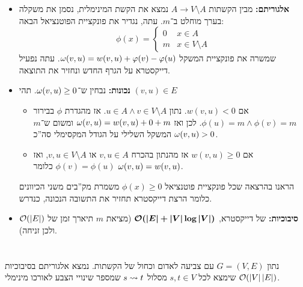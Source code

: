 \documentclass[]{../../../../tex/classes/homework}
\begin{document}
	\begin{itemize}
		\item \textbf{אלגוריתם: }מבין הקשתות $A \to V \setminus A$ נמצא את הקשת המינימלית, נסמן את משקלה בערך מוחלט ב־$m$. עתה, נגדיר את פונקציית הפוטנציאל הבאה: 
		\[ \phi(x) = \begin{cases}
			0 & x \in A \\
			m & x \in V \setminus  A
		\end{cases} \]
		שמשרה את פונקציית המשקל $\omega(v, u) = w(v, u) + \varphi(v) - \varphi(u)$. עתה נפעיל דייקסטרא על הגרף החדש ונחזיר את התוצאה. 
		\item \textbf{נכונות: }נבחין ש־$\omega(v, u) \ge 0$. תהי $(v, u) \in E$
		\begin{itemize}
			\item אם $w(v, u) < 0$. נתון $u \in A \land v \in V \setminus A$. אז מהגדרת $\phi$ בבירור $\phi(u) = m \land \phi(v) = m$. לכן ואז $\omega(v, u) = w(v, u) + 0 + m$ ומשום ש־$m$ המשקל השלילי על הגודל המקסימלי סה''כ $\omega(v, u) > 0$. 
			\item אם $w(v, u) \ge 0$ אז מהנתון בהכרח $v, u \in A$ או $v, u \in V \setminus A$, ואז $\phi(v) = \phi(u)$ כלומר $\omega(v, u) = w(v, u)$. 
		\end{itemize}
		הראנו בהרצאה שכל פונקציית פוטנציאל $\phi(x) \ge 0$ משמרת מק''בים משני הכיוונים כלומר הרצת דייקסטרא תחזיר את התשובה הנכונה, כנדרש. 
		\item \textbf{סיבוכיות: }של דייקסטרא, $\bm{\mathcal{O}(\left \lvert E \right \rvert + \left \lvert V \right \rvert \log \left \lvert V \right \rvert)}$ (מציאת $m$ תיארך זמן של $\mathcal{O}(\left \lvert E \right \rvert)$ ולכן זניחה). 
	\end{itemize}
	
	\npage
	\section{}
	נתון $G = (V, E)$ עם צביעה לאדום וכחול של הקשתות. נמצא אלגוריתם בסיבוכיות $\mathcal{O}(\left \lvert V \right \rvert \left \lvert E \right \rvert)$ שימצא לכל $s, t \in V$ מסלול $s \rightsquigarrow t$ שמספר שינויי הצבע לאורכו מינימלי. 
	
\end{document}
